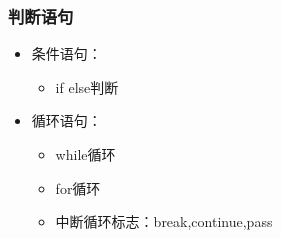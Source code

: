 \documentclass[11pt]{beamer}
\begin{document}
\begin{frame}[fragile]
	\frametitle{判断语句}
	\begin{minipage}[t]{0.5\linewidth}
		\begin{itemize}
			\item	条件语句：
			\begin{itemize}
				\item if else判断
			\end{itemize}
			\item 循环语句：
			\begin{itemize}
				\item while循环
				\item for循环
				\item 中断循环标志：break,continue,pass
			\end{itemize}
		\end{itemize}
	\end{minipage}%
	\begin{minipage}[t]{0.05\linewidth}
		\quad
	\end{minipage}%
	\begin{minipage}[t]{0.4\linewidth}
		\begin{figure}
				
		\end{figure}
	\end{minipage}
\end{frame}
\end{document}
